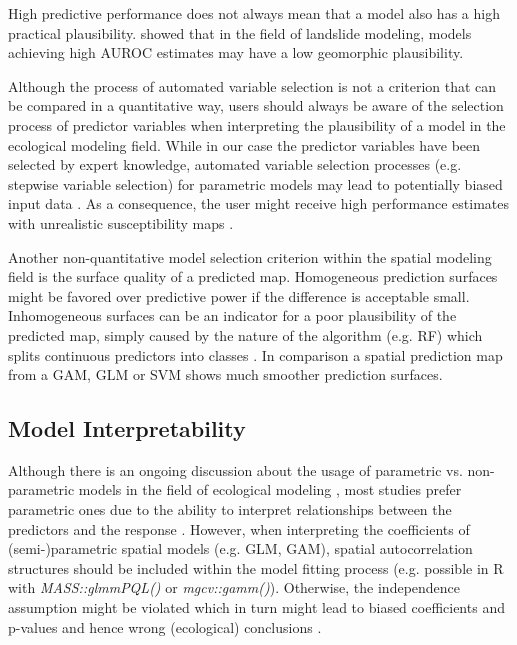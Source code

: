 \documentclass[review]{elsarticle}
\begin{document}
High predictive performance does not always mean that a model also has a high practical plausibility.
\cite{Steger2016} showed that in the field of landslide modeling, models achieving high AUROC estimates may have a low geomorphic plausibility.

Although the process of automated variable selection is not a criterion that can be compared in a quantitative way, users should always be aware of the selection process of predictor variables when interpreting the plausibility of a model in the ecological modeling field.
While in our case the predictor variables have been selected by expert knowledge, automated variable selection processes (e.g. stepwise variable selection) for parametric models may lead to potentially biased input data \citep{Steger2016}.
As a consequence, the user might receive high performance estimates with unrealistic susceptibility maps \citep{Demoulin2007}.

Another non-quantitative model selection criterion within the spatial modeling field is the surface quality of a predicted map.
Homogeneous prediction surfaces might be favored over predictive power if the difference is acceptable small.
Inhomogeneous surfaces can be an indicator for a poor plausibility of the predicted map, simply caused by the nature of the algorithm (e.g. RF) which splits continuous predictors into classes \citep{Steger2016}.
In comparison a spatial prediction map from a \ac{GAM}, \ac{GLM} or \ac{SVM} shows much smoother prediction surfaces.

\subsection{Model Interpretability}
\label{subsec:mod_interpret}

Although there is an ongoing discussion about the usage of parametric vs. non-parametric models in the field of ecological modeling \citep{Perretti2015}, most studies prefer parametric ones due to the ability to interpret relationships between the predictors and the response \citep{Aertsen2010, Jabot2015}.
However, when interpreting the coefficients of (semi-)parametric spatial models (e.g. \ac{GLM}, \ac{GAM}), spatial autocorrelation structures should be included within the model fitting process (e.g. possible in R with \textit{MASS::glmmPQL()} or \textit{mgcv::gamm()}).
Otherwise, the independence assumption might be violated which in turn might lead to biased coefficients and p-values and hence wrong (ecological) conclusions \citep{Cressie1993, Dormann2007, Telford2005}.
\end{document}
